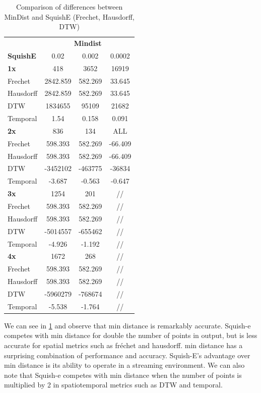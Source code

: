 \begin{table}[htbp]
	\centering
	\label{tab:mindist_vs_squish_comparison}
	\begin{tabular}{@{}lccc@{}}
		\toprule
		& \multicolumn{3}{c}{\textbf{Mindist}} \\
		\cmidrule(l){2-4}
		\textbf{SquishE} & 0.02 & 0.002 & 0.0002 \\
		\midrule
		\textbf{1x} 	& 418 	& 3652 & 16919 \\
		Frechet 		& 2842.859 & 582.269 & 33.645 \\
		Hausdorff 		& 2842.859 	& 582.269 & 33.645 \\
		DTW 			& 1834655 	& 95109 & 21682 \\
		Temporal 		& 1.54 	& 0.158 & 0.091 \\ \midrule
		\textbf{2x} 	& 836 & 134 & ALL \\
		Frechet 		& 598.393 & 582.269 & -66.409 \\
		Hausdorff 		& 598.393 & 582.269 & -66.409 \\
		DTW  		& -3452102 & -463775 & -36834 \\
		Temporal 	& -3.687 & -0.563 & -0.647 \\ \midrule
		\textbf{3x} 	& 1254 & 201 & // \\
		Frechet 		& 598.393 & 582.269 &  // \\
		Hausdorff 		& 598.393 & 582.269 &  // \\
		DTW 		& -5014557 & -655462 &  // \\
		Temporal 			& -4.926 & -1.192 & // \\ \midrule
		\textbf{4x} 	& 1672 & 268 &  // \\
		Frechet 		& 598.393 & 582.269 &  // \\
		Hausdorff 		& 598.393 & 582.269 &  // \\
		DTW 		& -5960279 & -768674 &  // \\
		Temporal 			& -5.538 & -1.764 &  // \\
		\bottomrule
	\end{tabular}
	\caption{Comparison of differences between MinDist and SquishE (Frechet, Hausdorff, DTW)}
\end{table}

We can see in \ref{tab:mindist_vs_squish_comparison} and observe that min distance is remarkably accurate. Squish-e competes with min distance for double the number of points in output, but is less accurate for spatial metrics such as fréchet and hausdorff. min distance has a surprising combination of performance and accuracy. Squish-E's advantage over min distance is its ability to operate in a streaming environment. We can also note that Squish-e competes with min distance when the number of points is multiplied by 2 in spatiotemporal metrics such as DTW and temporal.


